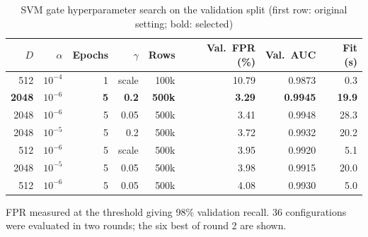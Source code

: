 \begin{table}[!htbp]
\centering
\caption{SVM gate hyperparameter search on the validation split (first row: original setting; bold: selected)}
\label{tab:svmtuning}
\small
\begin{tabular}{@{}rrrrrrrr@{}}
\toprule
\textbf{$D$} & \textbf{$\alpha$} & \textbf{Epochs} & \textbf{$\gamma$} & \textbf{Rows} & \textbf{Val.\ FPR (\%)} & \textbf{Val.\ AUC} & \textbf{Fit (s)} \\
\midrule
512 & $10^{-4}$ & 1 & scale & 100k & 10.79 & 0.9873 & 0.3 \\
\textbf{2048} & $10^{-6}$ & \textbf{5} & \textbf{0.2} & \textbf{500k} & \textbf{3.29} & \textbf{0.9945} & \textbf{19.9} \\
2048 & $10^{-6}$ & 5 & 0.05 & 500k & 3.41 & 0.9948 & 28.3 \\
2048 & $10^{-5}$ & 5 & 0.2 & 500k & 3.72 & 0.9932 & 20.2 \\
512 & $10^{-6}$ & 5 & scale & 500k & 3.95 & 0.9920 & 5.1 \\
2048 & $10^{-5}$ & 5 & 0.05 & 500k & 3.98 & 0.9915 & 20.0 \\
512 & $10^{-6}$ & 5 & 0.05 & 500k & 4.08 & 0.9930 & 5.0 \\
\bottomrule
\end{tabular}
\par\smallskip\parbox{\linewidth}{\footnotesize FPR measured at the threshold giving 98\% validation recall. 36 configurations were evaluated in two rounds; the six best of round 2 are shown.}
\end{table}
